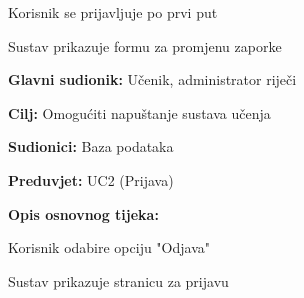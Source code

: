 \begin{packed_item}
\begin{packed_item}
\begin{packed_enum}
							\end{packed_enum}
							
							\item[3.c] Korisnik se prijavljuje po prvi put
							\item[] \begin{packed_enum}
								
								\item Sustav prikazuje formu za promjenu zaporke
								
							\end{packed_enum}
							
							
						\end{packed_item}
					\end{packed_item}
					
						\noindent {}
					\begin{packed_item}
						
						\item \textbf{Glavni sudionik: }Učenik, administrator riječi
						\item  \textbf{Cilj:} Omogućiti napuštanje sustava učenja
						\item  \textbf{Sudionici:} Baza podataka
						\item  \textbf{Preduvjet:} UC2 (Prijava)
						\item  \textbf{Opis osnovnog tijeka:}
						
						\item[] \begin{packed_enum}
							
							\item Korisnik odabire opciju "Odjava"
							\item Sustav prikazuje stranicu za prijavu
						\end{packed_enum}
					\end{packed_item}
					
